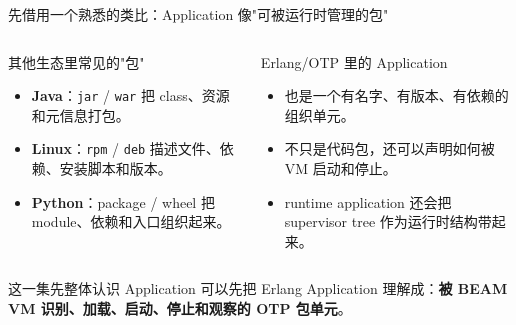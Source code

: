 \documentclass[aspectratio=169, 9pt]{beamer}
\newcommand{\keypoint}[1]{\textbf{\color{primary}#1}}
\newcommand{\code}[1]{\texttt{#1}}
\begin{document}
\begin{frame}{先借用一个熟悉的类比：Application 像"可被运行时管理的包"}
  \small
  \begin{columns}[T,onlytextwidth]
    \begin{block}{其他生态里常见的"包"}
      \begin{itemize}
        \item \keypoint{Java}：\code{jar} / \code{war} 把 class、资源和元信息打包。
        \item \keypoint{Linux}：\code{rpm} / \code{deb} 描述文件、依赖、安装脚本和版本。
        \item \keypoint{Python}：package / wheel 把 module、依赖和入口组织起来。
      \end{itemize}
    \end{block}
    \begin{exampleblock}{Erlang/OTP 里的 Application}
      \begin{itemize}
        \item 也是一个有名字、有版本、有依赖的组织单元。
        \item 不只是代码包，还可以声明如何被 VM 启动和停止。
        \item runtime application 还会把 supervisor tree 作为运行时结构带起来。
      \end{itemize}
    \end{exampleblock}
  \end{columns}
  \vspace{0.25cm}
\begin{alertblock}{这一集先整体认识 Application}
    可以先把 Erlang Application 理解成：\keypoint{被 BEAM VM 识别、加载、启动、停止和观察的 OTP 包单元}。
  \end{alertblock}
\end{frame}
\end{document}
